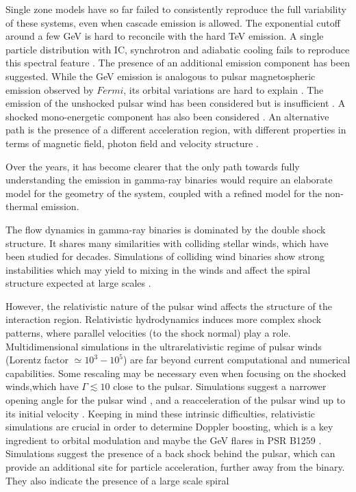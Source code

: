  Single zone models have so far failed to consistently reproduce the full variability of these systems, even when cascade emission is allowed. The exponential cutoff around a few GeV is hard to reconcile with the hard TeV emission. A single particle distribution with IC, synchrotron  and adiabatic  cooling fails to reproduce  this spectral feature \citep{2008MNRAS.383..467K,2013A&A...551A..17Z}.   The presence of an additional emission component has been suggested. While the GeV emission  is analogous to  pulsar magnetospheric emission observed by $Fermi$, its orbital variations are hard to explain \citep{2012ApJ...749...54H}.   The emission of the unshocked pulsar wind \citep{2007MNRAS.380..320K}   has been considered but is insufficient \citep{2008APh....30..239S}.  A shocked mono-energetic  component has also been considered \citep{2013A&A...557A.127D}.  An alternative path is the presence of a different acceleration region, with different properties in terms of magnetic field, photon field and velocity structure \citep{2013A&A...551A..17Z}.

Over the years, it has become clearer that the only path towards fully understanding the emission in gamma-ray binaries would require an elaborate model for the geometry of the system, coupled with a refined model for the non-thermal emission. 

The flow dynamics in gamma-ray binaries is dominated by the double shock structure. It  shares many similarities with colliding stellar winds, which have been studied for decades. Simulations of colliding wind binaries \citep{2009MNRAS.396.1743P,2011MNRAS.418.2618L} show strong instabilities which may yield to mixing in the winds \citep{2010MNRAS.403.1873Z} and affect the spiral structure expected at large scales \citep{2012A&A...546A..60L,2012A&A...544A..59B}.  

However, the relativistic nature of the pulsar wind affects the structure of the interaction region. Relativistic hydrodynamics induces more complex shock patterns, where parallel velocities (to the shock normal) play a role. Multidimensional simulations in the  ultrarelativistic regime of pulsar winds (Lorentz factor $\simeq 10^3-10^5$) are far beyond current computational and numerical capabilities. Some rescaling may be necessary even when focusing on the shocked winds,which have $\Gamma\lesssim 10$ close to the pulsar.  Simulations suggest a narrower opening angle for the pulsar wind \citep{2013A&A...560A..79L}, and a reacceleration of the pulsar wind up to its initial velocity \citep{2008MNRAS.387...63B}. Keeping in mind these intrinsic difficulties, relativistic simulations are crucial in order to determine Doppler boosting, which is a key ingredient to orbital modulation and maybe the GeV flares in PSR B1259 \citep{2012ApJ...753..127K}. Simulations suggest the presence of a back shock behind the pulsar, which can provide an additional site for particle acceleration, further away from the binary. They also indicate the presence of a large scale spiral \citep{2012A&A...544A..59B,2016MNRAS.456L..64B}


